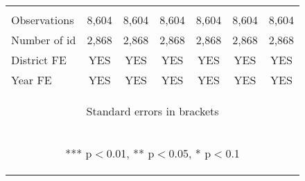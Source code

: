 \begin{center}
\begin{tabular}{lcccccc}
\vspace{4pt} & \begin{footnotesize}\end{footnotesize} & \begin{footnotesize}\end{footnotesize} & \begin{footnotesize}\end{footnotesize} & \begin{footnotesize}\end{footnotesize} & \begin{footnotesize}\end{footnotesize} & \begin{footnotesize}\end{footnotesize} \\
Observations & 8,604 & 8,604 & 8,604 & 8,604 & 8,604 & 8,604 \\
Number of id & 2,868 & 2,868 & 2,868 & 2,868 & 2,868 & 2,868 \\
District FE & YES & YES & YES & YES & YES & YES \\
 Year FE & YES & YES & YES & YES & YES & YES \\ \hline
\multicolumn{7}{c}{\begin{footnotesize} Standard errors in brackets\end{footnotesize}} \\
\multicolumn{7}{c}{\begin{footnotesize} *** p$<$0.01, ** p$<$0.05, * p$<$0.1\end{footnotesize}} \\
\end{tabular}
\end{center}
